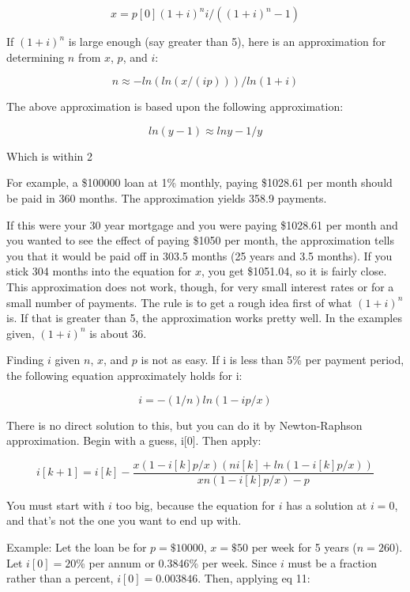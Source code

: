           \[ x = p[0]  (1 + i)^n  i / ( (1 + i)^n - 1)     \]


     If $(1 + i)^n$ is large enough (say greater than 5), here
     is an approximation for determining $n$ from $x$, $p$, and $i$:

          \[n \approx -ln( ln(x/(ip) ) ) / ln(1+i)               \]

     The above approximation is based upon the following approximation:

          \[ ln(y - 1)  \approx  ln y  -  1/y\]

    Which is within 2%

     For example, a \$100000 loan at 1\% monthly, paying \$1028.61
     per month should be paid in 360 months.  The approximation
     yields 358.9 payments.

     If this were your 30 year mortgage and you were paying \$1028.61
     per month and you wanted to see the effect of paying \$1050
     per month, the approximation tells you that it would be paid
     off in 303.5 months (25 years and 3.5 months).  If you stick
     304 months into the equation for $x$, you get \$1051.04, so
     it is fairly close.  This approximation does not work, though,
     for very small interest rates or for a small number of payments.
     The rule is to get a rough idea first of what $(1 + i)^n$ is.
     If that is greater than 5, the approximation works pretty
     well.  In the examples given, $(1 + i)^n$ is about 36.


     Finding $i$ given $n$, $x$, and $p$ is not as easy.  If i is less than
     5\% per payment period, the following equation approximately
     holds for i:

      \[    i = -(1/n) ln(1 - ip/x)    \]

     There is no direct solution to this, but you can do it by
     Newton-Raphson approximation.  Begin with a guess, i[0].
     Then apply:

\[i[k+1] = i[k] -\frac{x(1 - i[k]p/x)  (ni[k] + ln(1 - i[k]p/x))}
{xn(1 - i[k]p/x)  -  p}\]

     You must start with $i$ too big, because the equation for $i$ 
      has a solution
     at $i=0$, and that's not the one you want to end up with.

     Example:  Let the loan be for $p=\$10000$, $x=\$50$ per week for
     5 years ($n=260$).  Let $i[0] = 20$\% per annum or 0.3846\%
     per week.  Since $i$ must be a fraction rather than a percent,
     $i[0] = 0.003846$.  Then, applying eq 11:

